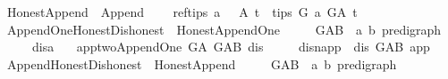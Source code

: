 \begin{isabellebody}
\isanewline
\isanewline
{}\isamarkupfalse%
\ Honest{\isacharunderscore}{\kern0pt}Append\ {\isacharequal}{\kern0pt}\ Append\ {\isacharplus}{\kern0pt}\isanewline
\ \ \ ref{\isacharunderscore}{\kern0pt}tips{\isacharcolon}{\kern0pt}\ {\isachardoublequoteopen}{\isasymforall}a\ {\isasymin}\ \ A{\isachardot}{\kern0pt}\ {\isasymforall}t\ {\isasymin}\ tips\ G{\isachardot}{\kern0pt}\ a\ {\isasymrightarrow}\isactrlsup {\isacharplus}{\kern0pt}\isactrlbsub G{\isacharunderscore}{\kern0pt}A\isactrlesub \ t{\isachardoublequoteclose}\ \ \isanewline
\isanewline
{}\isamarkupfalse%
\ Append{\isacharunderscore}{\kern0pt}One{\isacharunderscore}{\kern0pt}Honest{\isacharunderscore}{\kern0pt}Dishonest\ {\isacharequal}{\kern0pt}\ Honest{\isacharunderscore}{\kern0pt}Append{\isacharunderscore}{\kern0pt}One\ {\isacharplus}{\kern0pt}\ \isanewline
\ \ \ G{\isacharunderscore}{\kern0pt}AB\ {\isacharcolon}{\kern0pt}{\isacharcolon}{\kern0pt}\ {\isachardoublequoteopen}{\isacharparenleft}{\kern0pt}{\isacharprime}{\kern0pt}a{\isacharcomma}{\kern0pt}\ {\isacharprime}{\kern0pt}b{\isacharparenright}{\kern0pt}\ pre{\isacharunderscore}{\kern0pt}digraph{\isachardoublequoteclose}\ {\isacharparenleft}{\kern0pt}\isanewline
\ \ \ \ \ dis{\isacharcolon}{\kern0pt}{\isacharcolon}{\kern0pt}{\isacharprime}{\kern0pt}a\isanewline
\ \ \ app{\isacharunderscore}{\kern0pt}two{\isacharcolon}{\kern0pt}{\isachardoublequoteopen}Append{\isacharunderscore}{\kern0pt}One\ G{\isacharunderscore}{\kern0pt}A\ G{\isacharunderscore}{\kern0pt}AB\ dis{\isachardoublequoteclose}\isanewline
\ \ \ \ \ dis{\isacharunderscore}{\kern0pt}n{\isacharunderscore}{\kern0pt}app{\isacharcolon}{\kern0pt}\ {\isachardoublequoteopen}{\isasymnot}\ dis\ {\isasymrightarrow}\isactrlbsub G{\isacharunderscore}{\kern0pt}AB\isactrlesub \ app{\isachardoublequoteclose}\isanewline
\isanewline
\isanewline
{}\isamarkupfalse%
\ Append{\isacharunderscore}{\kern0pt}Honest{\isacharunderscore}{\kern0pt}Dishonest\ {\isacharequal}{\kern0pt}\ Honest{\isacharunderscore}{\kern0pt}Append\ {\isacharplus}{\kern0pt}\ \isanewline
\ \ \ G{\isacharunderscore}{\kern0pt}AB\ {\isacharcolon}{\kern0pt}{\isacharcolon}{\kern0pt}\ {\isachardoublequoteopen}{\isacharparenleft}{\kern0pt}{\isacharprime}{\kern0pt}a{\isacharcomma}{\kern0pt}\ {\isacharprime}{\kern0pt}b{\isacharparenright}{\kern0pt}\ pre{\isacharunderscore}{\kern0pt}digraph{\isachardoublequoteclose}\ {\isacharparenleft}{\kern0pt}\isanewline

\end{isabellebody}
